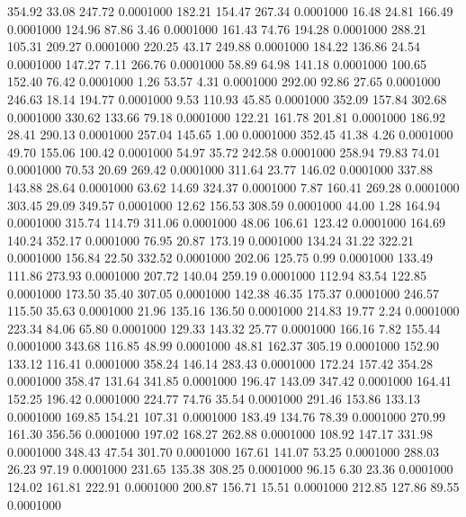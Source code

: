  354.92   33.08  247.72   0.0001000
 182.21  154.47  267.34   0.0001000
  16.48   24.81  166.49   0.0001000
 124.96   87.86    3.46   0.0001000
 161.43   74.76  194.28   0.0001000
 288.21  105.31  209.27   0.0001000
 220.25   43.17  249.88   0.0001000
 184.22  136.86   24.54   0.0001000
 147.27    7.11  266.76   0.0001000
  58.89   64.98  141.18   0.0001000
 100.65  152.40   76.42   0.0001000
   1.26   53.57    4.31   0.0001000
 292.00   92.86   27.65   0.0001000
 246.63   18.14  194.77   0.0001000
   9.53  110.93   45.85   0.0001000
 352.09  157.84  302.68   0.0001000
 330.62  133.66   79.18   0.0001000
 122.21  161.78  201.81   0.0001000
 186.92   28.41  290.13   0.0001000
 257.04  145.65    1.00   0.0001000
 352.45   41.38    4.26   0.0001000
  49.70  155.06  100.42   0.0001000
  54.97   35.72  242.58   0.0001000
 258.94   79.83   74.01   0.0001000
  70.53   20.69  269.42   0.0001000
 311.64   23.77  146.02   0.0001000
 337.88  143.88   28.64   0.0001000
  63.62   14.69  324.37   0.0001000
   7.87  160.41  269.28   0.0001000
 303.45   29.09  349.57   0.0001000
  12.62  156.53  308.59   0.0001000
  44.00    1.28  164.94   0.0001000
 315.74  114.79  311.06   0.0001000
  48.06  106.61  123.42   0.0001000
 164.69  140.24  352.17   0.0001000
  76.95   20.87  173.19   0.0001000
 134.24   31.22  322.21   0.0001000
 156.84   22.50  332.52   0.0001000
 202.06  125.75    0.99   0.0001000
 133.49  111.86  273.93   0.0001000
 207.72  140.04  259.19   0.0001000
 112.94   83.54  122.85   0.0001000
 173.50   35.40  307.05   0.0001000
 142.38   46.35  175.37   0.0001000
 246.57  115.50   35.63   0.0001000
  21.96  135.16  136.50   0.0001000
 214.83   19.77    2.24   0.0001000
 223.34   84.06   65.80   0.0001000
 129.33  143.32   25.77   0.0001000
 166.16    7.82  155.44   0.0001000
 343.68  116.85   48.99   0.0001000
  48.81  162.37  305.19   0.0001000
 152.90  133.12  116.41   0.0001000
 358.24  146.14  283.43   0.0001000
 172.24  157.42  354.28   0.0001000
 358.47  131.64  341.85   0.0001000
 196.47  143.09  347.42   0.0001000
 164.41  152.25  196.42   0.0001000
 224.77   74.76   35.54   0.0001000
 291.46  153.86  133.13   0.0001000
 169.85  154.21  107.31   0.0001000
 183.49  134.76   78.39   0.0001000
 270.99  161.30  356.56   0.0001000
 197.02  168.27  262.88   0.0001000
 108.92  147.17  331.98   0.0001000
 348.43   47.54  301.70   0.0001000
 167.61  141.07   53.25   0.0001000
 288.03   26.23   97.19   0.0001000
 231.65  135.38  308.25   0.0001000
  96.15    6.30   23.36   0.0001000
 124.02  161.81  222.91   0.0001000
 200.87  156.71   15.51   0.0001000
 212.85  127.86   89.55   0.0001000
